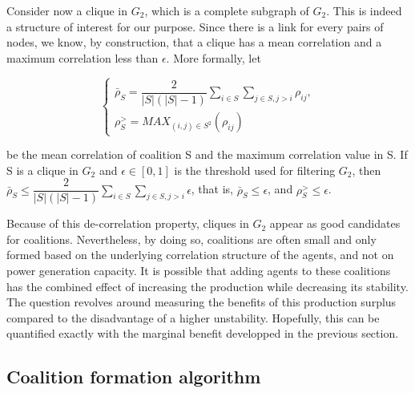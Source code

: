 \documentclass[conference]{IEEEtran}
\begin{document}
Consider now a clique in  $ G_{2} $, which is a complete subgraph of $ G_{2} $. This is indeed a structure of interest for our purpose. Since there is a link for every pairs of nodes, we know, by construction, that a clique has a mean correlation and a maximum correlation less than $ \epsilon $. More formally, let 

\begin{equation}
\left\{ \begin{array}{lll}
			\bar{\rho}_{S} = \dfrac{2}{|S|(|S|-1)} \sum_{i \in S} \sum_{j \in S, j>i} \rho_{ij}, \\ 
			\rho_{S}^{>} = MAX_{(i,j) \in S^{2}}(\rho_{ij})
\end{array} \right.			
\end{equation}

be the mean correlation of coalition S and the maximum correlation value in S. If S is a clique in $ G_{2} $ and $ \epsilon \in [0,1] $ is the threshold used for filtering $ G_{2} $, then $ \bar{\rho}_{S} \leq \dfrac{2}{|S|(|S|-1)} \sum_{i \in S} \sum_{j \in S, j>i} \epsilon $, that is, $ \bar{\rho}_{S} \leq \epsilon $, and $ \rho_{S}^{>} \leq \epsilon $.

Because of this de-correlation property, cliques in $ G_{2} $ appear as good candidates for coalitions. Nevertheless, by doing so, coalitions are often small and only formed based on the underlying correlation structure of the agents, and not on power generation capacity. It is possible that adding agents to these coalitions has the combined effect of increasing the production while decreasing its stability. The question revolves around measuring the benefits of this production surplus compared to the disadvantage of a higher unstability. Hopefully, this can be quantified exactly with the marginal benefit developped in the previous section.


\subsection{Coalition formation algorithm}
\end{document}
